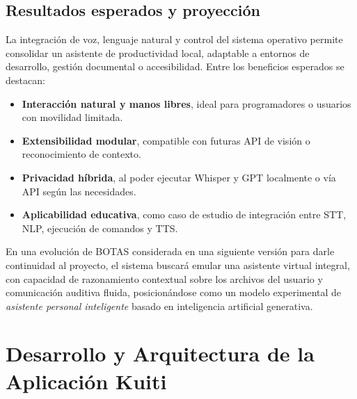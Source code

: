 \documentclass[12pt,a4paper]{report}
\numberwithin{figure}{section}
\begin{document}
\vspace{1em}
\subsection{Resultados esperados y proyección}
\label{subsec:resultados_voz}

La integración de voz, lenguaje natural y control del sistema operativo permite consolidar un asistente de productividad local, adaptable a entornos de desarrollo, gestión documental o accesibilidad.  
Entre los beneficios esperados se destacan:

\begin{itemize}
    \item \textbf{Interacción natural y manos libres}, ideal para programadores o usuarios con movilidad limitada.  
    \item \textbf{Extensibilidad modular}, compatible con futuras API de visión o reconocimiento de contexto.  
    \item \textbf{Privacidad híbrida}, al poder ejecutar Whisper y GPT localmente o vía API según las necesidades.  
    \item \textbf{Aplicabilidad educativa}, como caso de estudio de integración entre STT, NLP, ejecución de comandos y TTS.
\end{itemize}

En una evolución de BOTAS considerada en una siguiente versión para darle continuidad al proyecto, el sistema buscará emular una asistente virtual integral, con capacidad de razonamiento contextual sobre los archivos del usuario y comunicación auditiva fluida, posicionándose como un modelo experimental de \textit{asistente personal inteligente} basado en inteligencia artificial generativa.






\section[Arquitectura de Kuiti]{Desarrollo y Arquitectura de la Aplicación Kuiti}
\label{sec:arquitectura_kuiti}
\end{document}
